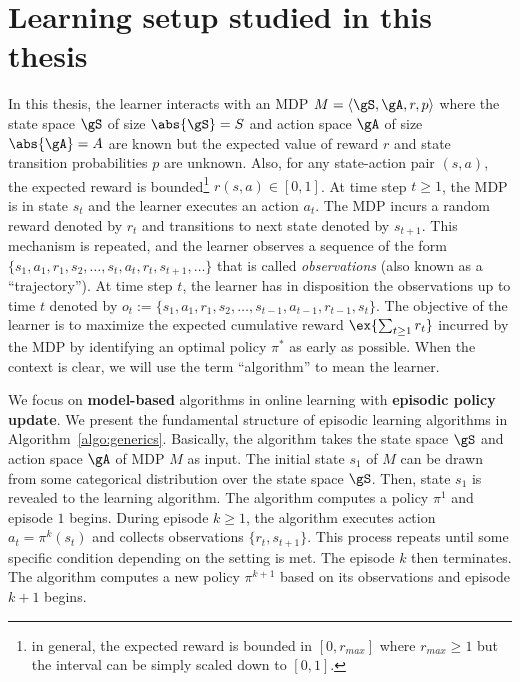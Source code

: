 
\section{Learning setup studied in this thesis}
\label{sec:intro_learning}

In this thesis, the learner interacts with an MDP $M=\langle\gS,\gA,r,p\rangle$ where the state space $\gS$ of size $\abs{\gS}=S$ and action space $\gA$ of size $\abs{\gA}=A$ are known but the expected value of reward $r$ and state transition probabilities $p$ are unknown.
Also, for any state-action pair $(s,a)$, the expected reward is bounded\footnote{in general, the expected reward is bounded in $[0, r_{max}]$ where $r_{max}\ge1$ but the interval can be simply scaled down to $[0,1]$.} $r(s,a)\in[0,1]$.
At time step $t\ge1$, the MDP is in state $s_t$ and the learner executes an action $a_t$.
The MDP incurs a random reward denoted by $r_t$ and transitions to next state denoted by $s_{t+1}$.
This mechanism is repeated, and the learner observes a sequence of the form $\{s_1,a_1,r_1,s_2,\dots,s_t,a_t,r_t,s_{t+1},\dots\}$ that is called \emph{observations} (also known as a ``trajectory'').
At time step $t$, the learner has in disposition the observations up to time $t$ denoted by $o_t:=\{s_1,a_1,r_1,s_2,\dots,s_{t-1},a_{t-1},r_{t-1},s_{t}\}$.
The objective of the learner is to maximize the expected cumulative reward $\ex{\sum_{t\ge1}r_t}$ incurred by the MDP by identifying an optimal policy $\pi^*$ as early as possible.
When the context is clear, we will use the term ``algorithm'' to mean the learner.

We focus on \textbf{model-based} algorithms in online learning with \textbf{episodic policy update}.
We present the fundamental structure of episodic learning algorithms in Algorithm~\ref{algo:generics}.
Basically, the algorithm takes the state space $\gS$ and action space $\gA$ of MDP $M$ as input.
The initial state $s_1$ of $M$ can be drawn from some categorical distribution over the state space $\gS$.
Then, state $s_1$ is revealed to the learning algorithm.
The algorithm computes a policy $\pi^1$ and episode $1$ begins.
During episode $k\ge1$, the algorithm executes action $a_t=\pi^k(s_t)$ and collects observations $\{r_t, s_{t+1}\}$.
This process repeats until some specific condition depending on the setting is met.
The episode $k$ then terminates.
The algorithm computes a new policy $\pi^{k+1}$ based on its observations and episode $k+1$ begins.

